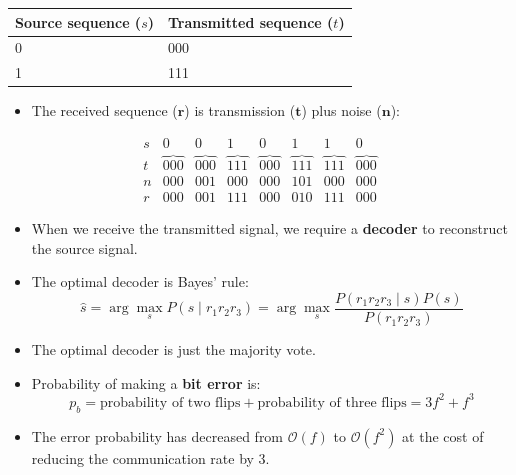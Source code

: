 \begin{center}
    \begin{tabular}{ll}
        \toprule
        \textbf{Source sequence ($s$)} & \textbf{Transmitted sequence ($t$)} \\
        \midrule
        0                              & 000                                 \\
        1                              & 111                                 \\
        \bottomrule
    \end{tabular}
\end{center}
\begin{itemize}
    \item The received sequence ($\mathbf{r}$) is transmission ($\mathbf{t}$) plus noise ($\mathbf{n}$):
\end{itemize}

\[
    \begin{array}{c|cccccccc}
        s & 0               & 0               & 1               & 0               & 1               & 1               & 0               \\
        t & \overbrace{000} & \overbrace{000} & \overbrace{111} & \overbrace{000} & \overbrace{111} & \overbrace{111} & \overbrace{000} \\
        n & 000             & 001             & 000             & 000             & 101             & 000             & 000             \\
        r & 000             & 001             & 111             & 000             & 010             & 111             & 000
    \end{array}
\]



\begin{itemize}
    \item When we receive the transmitted signal, we require a \textbf{decoder} to reconstruct the source signal.
    \item The optimal decoder is Bayes' rule:
          \[
              \hat{s} = \arg\max_s P(s \mid r_1 r_2 r_3) = \arg\max_s \frac{P(r_1 r_2 r_3 \mid s) P(s)}{P(r_1 r_2 r_3)}
          \]
    \item The optimal decoder is just the majority vote.
    \item Probability of making a \textbf{bit error} is:
          \[
              p_b = \text{probability of two flips} + \text{probability of three flips} = 3f^2 + f^3
          \]
    \item The error probability has decreased from $\mathcal{O}(f)$ to $\mathcal{O}(f^2)$ at the cost of reducing the communication rate by 3.

\end{itemize}


